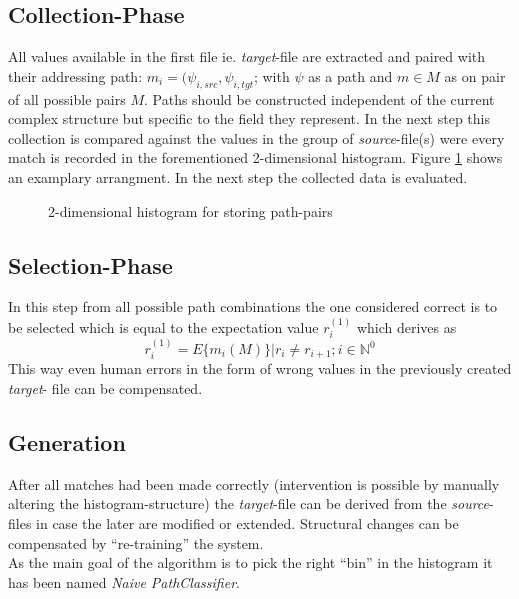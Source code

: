 \documentclass[conference]{IEEEtran}
\begin{document}
\subsection{Collection-Phase}
All values available in the first file ie. \textit{target}-file are extracted and
paired with their addressing path: $m_i = (\psi_{i,src}, \psi_{i,tgt}$; with $\psi$ as a path and
$m \in M$ as on pair of all possible pairs $M$. Paths should be constructed independent of the current
complex structure but specific to the field they represent. In the next step this
collection is compared against the values in the group of \textit{source}-file(s) were
every match is recorded in the forementioned 2-dimensional histogram. Figure
\ref{classifier_table} shows an examplary arrangment. In the next step the collected data
is evaluated.
\begin{figure}[h]
  \centering
 \caption{2-dimensional histogram for storing path-pairs}
 \label{classifier_table}
\end{figure}

\subsection{Selection-Phase}
In this step from all possible path combinations the one considered correct is to be selected
which is equal to the expectation value $r_i^{(1)}$ which derives as
$$ r_i^{(1)} = E \{m_i (M)\} | r_i \neq r_{i+1}; i \in \mathbb{N}^0 $$
This way even human errors in the form of wrong values in the previously created \textit{target}-
file can be compensated.

\subsection{Generation}
After all matches had been made correctly (intervention is possible by manually altering the
histogram-structure) the \textit{target}-file can be derived from the \textit{source}-files in
case the later are modified or extended. Structural changes can be compensated by ``re-training''
the system.\\As the main goal of the algorithm is to pick the right ``bin'' in the histogram it
has been named \textit{Naive PathClassifier}.
\end{document}
